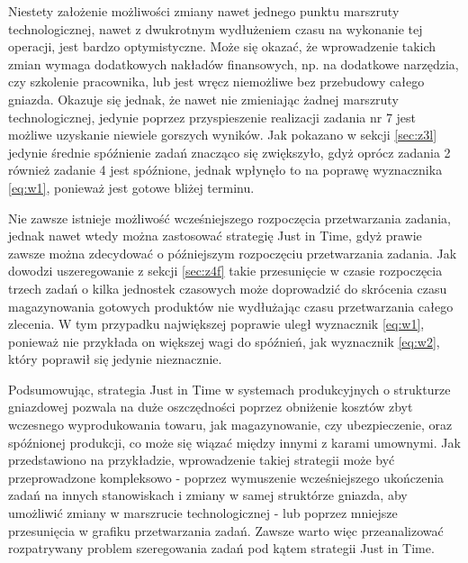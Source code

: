 \documentclass[twoside]{kInzynierka}
\begin{document}
Niestety założenie możliwości zmiany nawet jednego punktu marszruty technologicznej, nawet z dwukrotnym wydłużeniem czasu na wykonanie tej operacji, jest bardzo optymistyczne. Może się okazać, że wprowadzenie takich zmian wymaga dodatkowych nakładów finansowych, np. na dodatkowe narzędzia, czy szkolenie pracownika, lub jest wręcz niemożliwe bez przebudowy całego gniazda. Okazuje się jednak, że nawet nie zmieniając żadnej marszruty technologicznej, jedynie poprzez przyspieszenie realizacji zadania nr 7 jest możliwe uzyskanie niewiele gorszych wyników. Jak pokazano w sekcji \ref{sec:z3l} jedynie średnie spóźnienie zadań znacząco się zwiększyło, gdyż oprócz zadania 2 również zadanie 4 jest spóźnione, jednak wpłynęło to na poprawę wyznacznika \eqref{eq:w1}, ponieważ jest gotowe bliżej terminu.

Nie zawsze istnieje możliwość wcześniejszego rozpoczęcia przetwarzania zadania, jednak nawet wtedy można zastosować strategię Just in Time, gdyż prawie zawsze można zdecydować o późniejszym rozpoczęciu przetwarzania zadania. Jak dowodzi uszeregowanie z sekcji \ref{sec:z4f} takie przesunięcie w czasie rozpoczęcia trzech zadań o kilka jednostek czasowych może doprowadzić do skrócenia czasu magazynowania gotowych produktów nie wydłużając czasu przetwarzania całego zlecenia. W tym przypadku największej poprawie uległ wyznacznik \eqref{eq:w1}, ponieważ nie przykłada on większej wagi do spóźnień, jak wyznacznik \eqref{eq:w2}, który poprawił się jedynie nieznacznie.

Podsumowując, strategia Just in Time w systemach produkcyjnych o strukturze gniazdowej pozwala na duże oszczędności poprzez obniżenie kosztów zbyt wczesnego wyprodukowania towaru, jak magazynowanie, czy ubezpieczenie, oraz spóźnionej produkcji, co może się wiązać między innymi z karami umownymi. Jak przedstawiono na przykładzie, wprowadzenie takiej strategii może być przeprowadzone kompleksowo - poprzez wymuszenie wcześniejszego ukończenia zadań na innych stanowiskach i zmiany w samej struktórze gniazda, aby umożliwić zmiany w marszrucie technologicznej - lub poprzez mniejsze przesunięcia w grafiku przetwarzania zadań. Zawsze warto więc przeanalizować rozpatrywany problem szeregowania zadań pod kątem strategii Just in Time.
\end{document}
